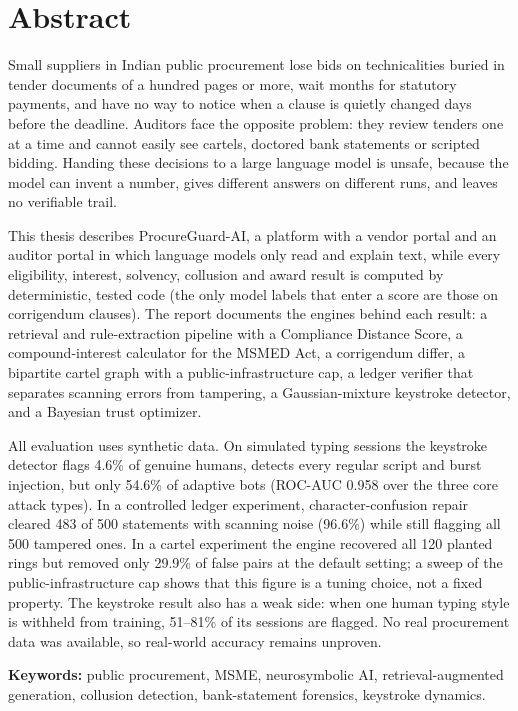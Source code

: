 \documentclass[a4paper, 12pt]{report}
\theoremstyle{definition}
\begin{document}
\chapter*{Abstract}
Small suppliers in Indian public procurement lose bids on technicalities buried in tender documents of a hundred pages or more, wait months for statutory payments, and have no way to notice when a clause is quietly changed days before the deadline. Auditors face the opposite problem: they review tenders one at a time and cannot easily see cartels, doctored bank statements or scripted bidding. Handing these decisions to a large language model is unsafe, because the model can invent a number, gives different answers on different runs, and leaves no verifiable trail.

This thesis describes ProcureGuard-AI, a platform with a vendor portal and an auditor portal in which language models only read and explain text, while every eligibility, interest, solvency, collusion and award result is computed by deterministic, tested code (the only model labels that enter a score are those on corrigendum clauses). The report documents the engines behind each result: a retrieval and rule-extraction pipeline with a Compliance Distance Score, a compound-interest calculator for the MSMED Act, a corrigendum differ, a bipartite cartel graph with a public-infrastructure cap, a ledger verifier that separates scanning errors from tampering, a Gaussian-mixture keystroke detector, and a Bayesian trust optimizer.

All evaluation uses synthetic data. On simulated typing sessions the keystroke detector flags 4.6\% of genuine humans, detects every regular script and burst injection, but only 54.6\% of adaptive bots (ROC-AUC 0.958 over the three core attack types). In a controlled ledger experiment, character-confusion repair cleared 483 of 500 statements with scanning noise (96.6\%) while still flagging all 500 tampered ones. In a cartel experiment the engine recovered all 120 planted rings but removed only 29.9\% of false pairs at the default setting; a sweep of the public-infrastructure cap shows that this figure is a tuning choice, not a fixed property. The keystroke result also has a weak side: when one human typing style is withheld from training, 51--81\% of its sessions are flagged. No real procurement data was available, so real-world accuracy remains unproven.

\medskip
\noindent\textbf{Keywords:} public procurement, MSME, neurosymbolic AI, retrieval-augmented generation, collusion detection, bank-statement forensics, keystroke dynamics.

\clearpage
{}
\setcounter{page}{1}







\appendix


\newpage
\renewcommand{\bibname}{References}


\end{document}
